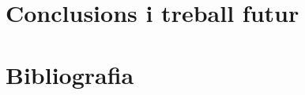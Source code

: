 \documentclass[11pt,a4paper,catalan]{article}
\begin{document}
\newpage
\section{Conclusions i treball futur}
\newpage
\section{Bibliografia}
\end{document}
